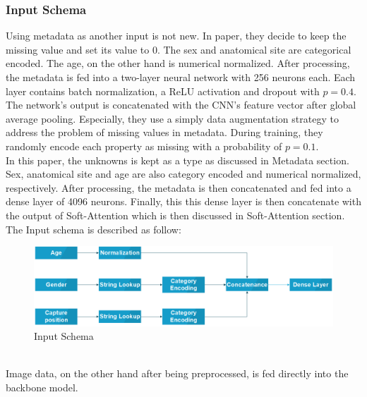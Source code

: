 \subsubsection{Input Schema}
Using metadata as another input is not new. In paper\cite{03910}, they decide to keep the missing value and set its value to $0$. The sex and anatomical site are categorical encoded. The age, on the other hand is numerical normalized. After processing, the metadata is fed into a two-layer neural network with 256 neurons each. Each layer contains batch normalization, a ReLU\cite{08375} activation and dropout with $p = 0.4$. The network’s output is concatenated with the CNN’s feature vector after global average pooling. Especially, they use a simply data augmentation strategy to address the problem of missing values in metadata. During training, they randomly encode each property as missing with a probability of $p = 0.1$. \\
In this paper, the unknowns is kept as a type as discussed in Metadata section. Sex, anatomical site and age are also category encoded and numerical normalized, respectively. After processing, the metadata is then concatenated and fed into a dense layer of 4096 neurons. Finally, this this dense layer is then concatenate with the output of Soft-Attention which is then discussed in Soft-Attention section. \\
The Input schema is described as follow:\\
\begin{figure}[h]
	\centering
	\includegraphics[width=0.7\linewidth]{"Diagram/Input Schema"}
	\caption{Input Schema}
	\label{fig:input-schema}
\end{figure}\\
Image data, on the other hand after being preprocessed, is fed directly into the backbone model. 
